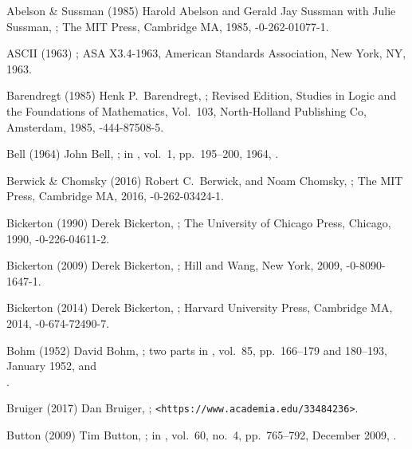 

\biblabel Abelson \& Sussman (1985)
Harold Abelson and Gerald Jay Sussman with Julie Sussman,
;
The MIT Press, Cambridge MA, 1985,
-0-262-01077-1.

\biblabel ASCII (1963)
;
ASA X3.4-1963,
American Standards Association, New York, NY, 1963.

\biblabel Barendregt (1985)
Henk P.\ Barendregt,
;
Revised Edition, Studies in Logic and the Foundations of Mathematics,
Vol.\ 103, North-Holland Publishing Co, Amsterdam, 1985,
-444-87508-5.

\biblabel Bell (1964)
John Bell,
;
in ,
vol.\ 1, pp.\ 195--200, 1964,
.

\biblabel Berwick \& Chomsky (2016)
Robert C.\ Berwick, and Noam Chomsky,
;
The MIT Press, Cambridge MA, 2016,
-0-262-03424-1.

\biblabel Bickerton (1990)
Derek Bickerton,
;
The University of Chicago Press, Chicago, 1990,
-0-226-04611-2.

\biblabel Bickerton (2009)
Derek Bickerton,
;
Hill and Wang, New York, 2009,
-0-8090-1647-1.

\biblabel Bickerton (2014)
Derek Bickerton,
;
Harvard University Press, Cambridge MA, 2014,
-0-674-72490-7.

\biblabel Bohm (1952)
David Bohm,
; two parts
in ,
vol.\ 85, pp.\ 166--179 and 180--193, January 1952,
 and\\
.

\biblabel Bruiger (2017)
Dan Bruiger,
;
{\tt \URL <https://www.academia.edu/33484236>}.

\biblabel Button (2009)
Tim Button,
;
in ,
vol.\ 60, no.\ 4, pp.\ 765--792, December 2009,
.

